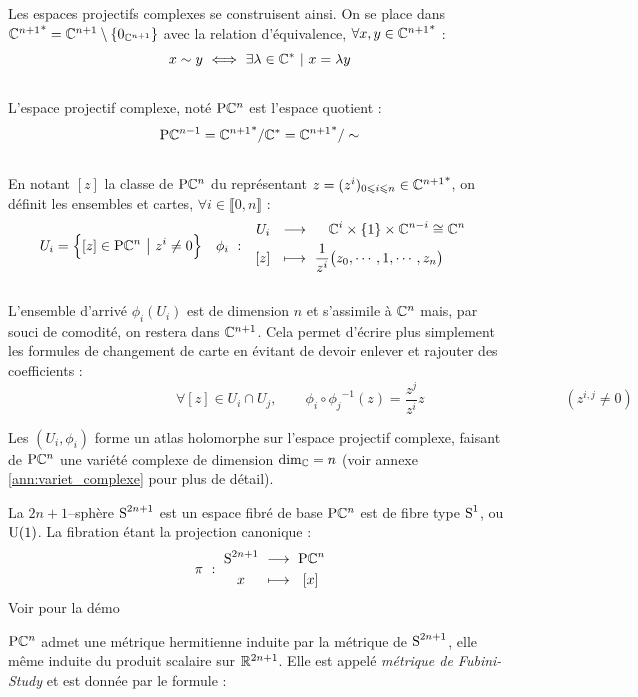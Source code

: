 Les espaces projectifs complexes se construisent ainsi. On se place dans ${\C^{n+1}}^*=\C^{n+1}\setminus\{0_{\C^{n+1}}\}$ avec la relation d'équivalence, $\forall x,y\in{\C^{n+1}}^*$ :
\[x \sim y\ \Llr\ \exists \lambda\in\C^*\ |\ x=\lambda y\]
\\
L'espace projectif complexe, noté $\PC{n}$ est l'espace quotient :
\[\PC{n-1} = {\C^{n+1}}^*/\C^* = {\C^{n+1}}^*/\sim\]
\\
En notant $[z]$ la classe de $\PC{n}$ du représentant $z = (z^i)_{0\leq i\leq n}\in{\C^{n+1}}^*$, on définit les ensembles et cartes, $\forall i\in\llbracket0,n\rrbracket$ :
\begin{align}
	U_i &= \Big\{[z]\in\PC{n}\ \big|\ z^i\neq 0\Big\}  &  \phi_i\  :\quad &\begin{aligned}
		U_i\ \ &\lr\quad\ \C^{i}\times \{1\} \times\C^{n-i}\cong \C^{n} \\ [z]\ \ &\lmt\ \frac{1}{z^i}\big(z_0,\cdots, 1,\cdots, z_n\big)
	\end{aligned}
\end{align}
\\
L'ensemble d'arrivé $\phi_i(U_i)$ est de dimension $n$ et s'assimile à $\C^{n}$ mais, par souci de comodité, on restera dans $\C^{n+1}$. Cela permet  d'écrire plus simplement les formules de changement de carte en évitant de devoir enlever et rajouter des coefficients :
\[\qquad\qquad\qquad\qquad\qquad\qquad \forall [z]\in U_i\cap U_j,\qquad \phi_i \circ {\phi_j}^{-1}(z) = \frac{z^j}{z^i}z\qquad\qquad\qquad\qquad\qquad (z^{i,j}\neq 0) \qquad\]

Les $(U_i,\phi_i)$ forme un atlas holomorphe sur l'espace projectif complexe, faisant de $\PC{n}$ une variété complexe de dimension $\dim[\C] = n$ (voir annexe \ref{ann:variet_complexe} pour plus de détail).

\begin{proposition}
	La $2n+1$--sphère $\S{2n+1}$ est un espace fibré de base $\PC{n}$ est de fibre type $\S{1}$, ou $\U{1}$. La fibration étant la projection canonique :
	\[\pi\ :\ \begin{aligned}\S{2n+1}\ &\lr\ \PC{n} \\ x\quad\ &\lmt\ \ [x]\end{aligned}\]
	Voir \cite{lafontaine_introduction_2015} pour la démo
\end{proposition}


\begin{proposition}
	$\PC{n}$ admet une métrique hermitienne induite par la métrique de $\S{2n+1}$, elle même induite du produit scalaire sur $\R^{2n+1}$. Elle est appelé \emph{métrique de Fubini-Study} et est donnée par le formule :
	\[\]
\end{proposition}


